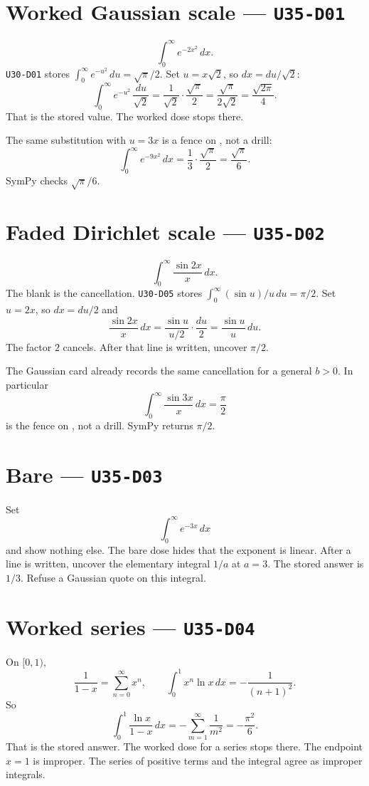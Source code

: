 \section{Worked Gaussian scale --- \texttt{U35-D01}}
\[
\int_0^{\infty}e^{-2x^2}\,dx.
\]
\texttt{U30-D01} stores $\int_0^{\infty}e^{-u^2}\,du=\sqrt{\pi}/2$. Set $u=x\sqrt{2}$, so $dx=du/\sqrt{2}$:
\[
\int_0^{\infty}e^{-u^2}\,\frac{du}{\sqrt{2}}=\frac{1}{\sqrt{2}}\cdot\frac{\sqrt{\pi}}{2}=\frac{\sqrt{\pi}}{2\sqrt{2}}=\frac{\sqrt{2\pi}}{4}.
\]
That is the stored value. The worked dose stops there.

The same substitution with $u=3x$ is a fence on , not a drill:
\[
\int_0^{\infty}e^{-9x^2}\,dx=\frac{1}{3}\cdot\frac{\sqrt{\pi}}{2}=\frac{\sqrt{\pi}}{6}.
\]
SymPy checks $\sqrt{\pi}/6$.

\section{Faded Dirichlet scale --- \texttt{U35-D02}}
\[
\int_0^{\infty}\frac{\sin 2x}{x}\,dx.
\]
The blank is the cancellation. \texttt{U30-D05} stores $\int_0^{\infty}(\sin u)/u\,du=\pi/2$. Set $u=2x$, so $dx=du/2$ and
\[
\frac{\sin 2x}{x}\,dx=\frac{\sin u}{u/2}\cdot\frac{du}{2}=\frac{\sin u}{u}\,du.
\]
The factor $2$ cancels. After that line is written, uncover $\pi/2$.

The Gaussian card already records the same cancellation for a general $b>0$. In particular
\[
\int_0^{\infty}\frac{\sin 3x}{x}\,dx=\frac\pi2
\]
is the fence on , not a drill. SymPy returns $\pi/2$.

\section{Bare --- \texttt{U35-D03}}
Set
\[
\int_0^{\infty}e^{-3x}\,dx
\]
and show nothing else. The bare dose hides that the exponent is linear. After a line is written, uncover the elementary integral $1/a$ at $a=3$. The stored answer is $1/3$. Refuse a Gaussian quote on this integral.

\section{Worked series --- \texttt{U35-D04}}
On $[0,1)$,
\[
\frac{1}{1-x}=\sum_{n=0}^{\infty}x^n,\qquad \int_0^1 x^n\ln x\,dx=-\frac{1}{(n+1)^2}.
\]
So
\[
\int_0^1\frac{\ln x}{1-x}\,dx=-\sum_{m=1}^{\infty}\frac{1}{m^2}=-\frac{\pi^2}{6}.
\]
That is the stored answer. The worked dose for a series stops there. The endpoint $x=1$ is improper. The series of positive terms and the integral agree as improper integrals.

